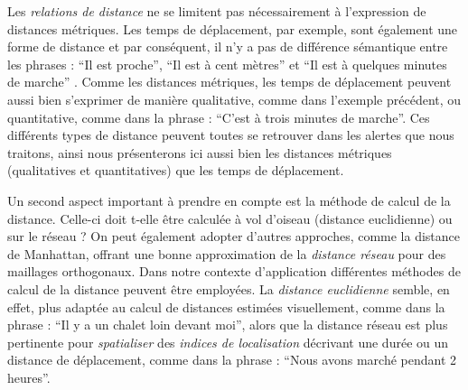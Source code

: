 Les \emph{relations de distance} ne se limitent pas nécessairement à
l'expression de distances métriques. Les temps de déplacement, par
exemple, sont également une forme de distance et par conséquent, il
n'y a pas de différence sémantique entre les phrases : \enquote{Il est
  proche}, \enquote{Il est à cent mètres} et \enquote{Il est à
  quelques minutes de marche} \autocite{Borillo1998,
  Egenhofer1995}. Comme les distances métriques, les temps de
déplacement peuvent aussi bien s'exprimer de manière qualitative,
comme dans l'exemple précédent, ou quantitative, comme dans la phrase
: \enquote{C'est à trois minutes de marche}.  Ces différents types de
distance peuvent toutes se retrouver dans les alertes que nous
traitons, ainsi nous présenterons ici aussi bien les distances
métriques (qualitatives et quantitatives) que les temps de
déplacement.

Un second aspect important à prendre en compte est la méthode de
calcul de la distance. Celle-ci doit t-elle être calculée à vol
d'oiseau (\ie distance euclidienne) ou sur le réseau ? On peut
également adopter d'autres approches, comme la distance de Manhattan,
offrant une bonne approximation de la \emph{distance réseau} pour des
maillages orthogonaux. Dans notre contexte d’application différentes
méthodes de calcul de la distance peuvent être employées. La
\emph{distance euclidienne} semble, en effet, plus adaptée au calcul
de distances estimées visuellement, comme dans la phrase : \enquote{Il
  y a un chalet loin devant moi}, alors que la distance réseau est
plus pertinente pour \emph{spatialiser} des \emph{indices de
  localisation} décrivant une durée ou un distance de déplacement,
comme dans la phrase : \enquote{Nous avons marché pendant 2 heures}.

